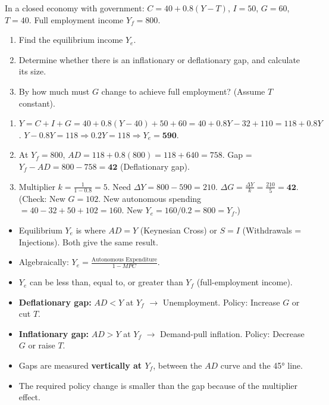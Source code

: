 \documentclass[11pt]{article}
\begin{document}
\begin{exercice}
In a closed economy with government:
$C = 40 + 0.8(Y - T)$, $I = 50$, $G = 60$, $T = 40$. Full employment income $Y_f = 800$.
\begin{enumerate}
    \item Find the equilibrium income $Y_e$.
    \item Determine whether there is an inflationary or deflationary gap, and calculate its size.
    \item By how much must $G$ change to achieve full employment? (Assume $T$ constant).
\end{enumerate}
\end{exercice}

\begin{corrige}
\begin{enumerate}
    \item $Y = C + I + G = 40 + 0.8(Y-40) + 50 + 60 = 40 + 0.8Y - 32 + 110 = 118 + 0.8Y$.
    $Y - 0.8Y = 118 \Rightarrow 0.2Y = 118 \Rightarrow Y_e = \mathbf{590}$.
    \item At $Y_f = 800$, $AD = 118 + 0.8(800) = 118 + 640 = 758$.
    Gap = $Y_f - AD = 800 - 758 = \mathbf{42}$ (Deflationary gap).
    \item Multiplier $k = \frac{1}{1-0.8} = 5$. Need $\Delta Y = 800 - 590 = 210$.
    $\Delta G = \frac{\Delta Y}{k} = \frac{210}{5} = \mathbf{42}$.
    (Check: New $G = 102$. New autonomous spending $= 40 - 32 + 50 + 102 = 160$. New $Y_e = 160/0.2 = 800 = Y_f$.)
\end{enumerate}
\end{corrige}

\begin{aretenir}
\begin{itemize}
    \item Equilibrium $Y_e$ is where $AD = Y$ (Keynesian Cross) or $S = I$ (Withdrawals = Injections). Both give the same result.
    \item Algebraically: $Y_e = \frac{\text{Autonomous Expenditure}}{1 - MPC}$.
    \item $Y_e$ can be less than, equal to, or greater than $Y_f$ (full-employment income).
    \item \textbf{Deflationary gap:} $AD < Y$ at $Y_f$ $\rightarrow$ Unemployment. Policy: Increase $G$ or cut $T$.
    \item \textbf{Inflationary gap:} $AD > Y$ at $Y_f$ $\rightarrow$ Demand-pull inflation. Policy: Decrease $G$ or raise $T$.
    \item Gaps are measured \textbf{vertically at $Y_f$}, between the $AD$ curve and the 45° line.
    \item The required policy change is smaller than the gap because of the multiplier effect.
\end{itemize}
\end{aretenir}
\end{document}
